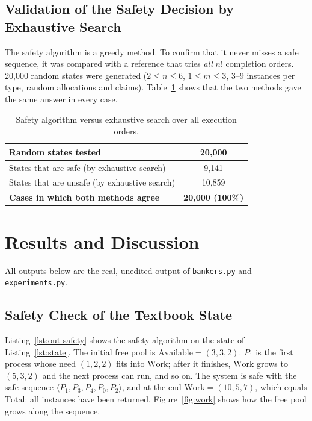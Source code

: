 \documentclass[11pt,a4paper]{report}
\begin{document}
\subsection{Validation of the Safety Decision by Exhaustive Search}
The safety algorithm is a greedy method. To confirm that it never misses a safe sequence, it was compared with a reference that tries \emph{all} $n!$ completion orders. 20{,}000 random states were generated ($2\le n\le 6$, $1\le m\le 3$, 3--9 instances per type, random allocations and claims). Table~\ref{tab:e1} shows that the two methods gave the same answer in every case.

\begin{table}[h!]
\centering
\caption{Safety algorithm versus exhaustive search over all execution orders.}
\label{tab:e1}
\renewcommand{\arraystretch}{1.2}
\begin{tabular}{|l|c|}
\hline
Random states tested & 20{,}000 \\ \hline
States that are safe (by exhaustive search) & 9{,}141 \\ \hline
States that are unsafe (by exhaustive search) & 10{,}859 \\ \hline
\textbf{Cases in which both methods agree} & \textbf{20{,}000 (100\%)} \\ \hline
\end{tabular}
\end{table}

\section{Results and Discussion}
\label{sec:results}
All outputs below are the real, unedited output of \texttt{bankers.py} and \texttt{experiments.py}.

\subsection{Safety Check of the Textbook State}
Listing~\ref{lst:out-safety} shows the safety algorithm on the state of Listing~\ref{lst:state}. The initial free pool is $\text{Available}=(3,3,2)$. $P_1$ is the first process whose need $(1,2,2)$ fits into $\text{Work}$; after it finishes, $\text{Work}$ grows to $(5,3,2)$ and the next process can run, and so on. The system is safe with the safe sequence $\langle P_1,P_3,P_4,P_0,P_2\rangle$, and at the end $\text{Work}=(10,5,7)$, which equals $\text{Total}$: all instances have been returned. Figure~\ref{fig:work} shows how the free pool grows along the sequence.
\end{document}

